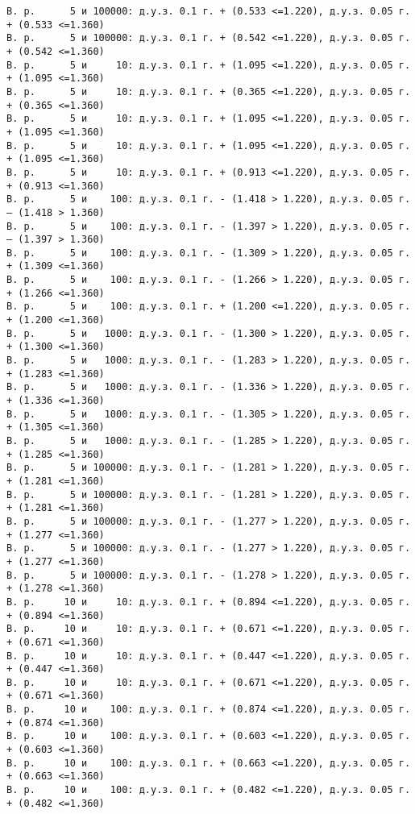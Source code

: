 \documentclass[11pt]{article}
\begin{document}
{\begin{Verbatim}[commandchars=\\\{\}]
В. р.      5 и 100000: д.у.з. 0.1 г. + (0.533 <=1.220), д.у.з. 0.05 г. + (0.533 <=1.360)
В. р.      5 и 100000: д.у.з. 0.1 г. + (0.542 <=1.220), д.у.з. 0.05 г. + (0.542 <=1.360)
В. р.      5 и     10: д.у.з. 0.1 г. + (1.095 <=1.220), д.у.з. 0.05 г. + (1.095 <=1.360)
В. р.      5 и     10: д.у.з. 0.1 г. + (0.365 <=1.220), д.у.з. 0.05 г. + (0.365 <=1.360)
В. р.      5 и     10: д.у.з. 0.1 г. + (1.095 <=1.220), д.у.з. 0.05 г. + (1.095 <=1.360)
В. р.      5 и     10: д.у.з. 0.1 г. + (1.095 <=1.220), д.у.з. 0.05 г. + (1.095 <=1.360)
В. р.      5 и     10: д.у.з. 0.1 г. + (0.913 <=1.220), д.у.з. 0.05 г. + (0.913 <=1.360)
В. р.      5 и    100: д.у.з. 0.1 г. - (1.418 > 1.220), д.у.з. 0.05 г. – (1.418 > 1.360)
В. р.      5 и    100: д.у.з. 0.1 г. - (1.397 > 1.220), д.у.з. 0.05 г. – (1.397 > 1.360)
В. р.      5 и    100: д.у.з. 0.1 г. - (1.309 > 1.220), д.у.з. 0.05 г. + (1.309 <=1.360)
В. р.      5 и    100: д.у.з. 0.1 г. - (1.266 > 1.220), д.у.з. 0.05 г. + (1.266 <=1.360)
В. р.      5 и    100: д.у.з. 0.1 г. + (1.200 <=1.220), д.у.з. 0.05 г. + (1.200 <=1.360)
В. р.      5 и   1000: д.у.з. 0.1 г. - (1.300 > 1.220), д.у.з. 0.05 г. + (1.300 <=1.360)
В. р.      5 и   1000: д.у.з. 0.1 г. - (1.283 > 1.220), д.у.з. 0.05 г. + (1.283 <=1.360)
В. р.      5 и   1000: д.у.з. 0.1 г. - (1.336 > 1.220), д.у.з. 0.05 г. + (1.336 <=1.360)
В. р.      5 и   1000: д.у.з. 0.1 г. - (1.305 > 1.220), д.у.з. 0.05 г. + (1.305 <=1.360)
В. р.      5 и   1000: д.у.з. 0.1 г. - (1.285 > 1.220), д.у.з. 0.05 г. + (1.285 <=1.360)
В. р.      5 и 100000: д.у.з. 0.1 г. - (1.281 > 1.220), д.у.з. 0.05 г. + (1.281 <=1.360)
В. р.      5 и 100000: д.у.з. 0.1 г. - (1.281 > 1.220), д.у.з. 0.05 г. + (1.281 <=1.360)
В. р.      5 и 100000: д.у.з. 0.1 г. - (1.277 > 1.220), д.у.з. 0.05 г. + (1.277 <=1.360)
В. р.      5 и 100000: д.у.з. 0.1 г. - (1.277 > 1.220), д.у.з. 0.05 г. + (1.277 <=1.360)
В. р.      5 и 100000: д.у.з. 0.1 г. - (1.278 > 1.220), д.у.з. 0.05 г. + (1.278 <=1.360)
В. р.     10 и     10: д.у.з. 0.1 г. + (0.894 <=1.220), д.у.з. 0.05 г. + (0.894 <=1.360)
В. р.     10 и     10: д.у.з. 0.1 г. + (0.671 <=1.220), д.у.з. 0.05 г. + (0.671 <=1.360)
В. р.     10 и     10: д.у.з. 0.1 г. + (0.447 <=1.220), д.у.з. 0.05 г. + (0.447 <=1.360)
В. р.     10 и     10: д.у.з. 0.1 г. + (0.671 <=1.220), д.у.з. 0.05 г. + (0.671 <=1.360)
В. р.     10 и    100: д.у.з. 0.1 г. + (0.874 <=1.220), д.у.з. 0.05 г. + (0.874 <=1.360)
В. р.     10 и    100: д.у.з. 0.1 г. + (0.603 <=1.220), д.у.з. 0.05 г. + (0.603 <=1.360)
В. р.     10 и    100: д.у.з. 0.1 г. + (0.663 <=1.220), д.у.з. 0.05 г. + (0.663 <=1.360)
В. р.     10 и    100: д.у.з. 0.1 г. + (0.482 <=1.220), д.у.з. 0.05 г. + (0.482 <=1.360)

\end{Verbatim}}
\end{document}
